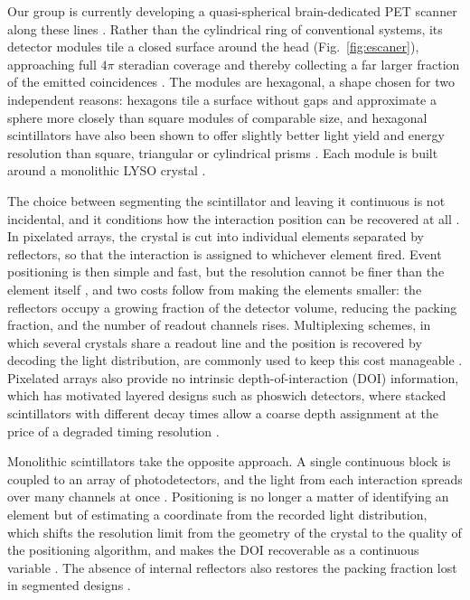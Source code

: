 \documentclass[10pt,conference]{IEEEtran}
\begin{document}
Our group is currently developing a quasi-spherical brain-dedicated PET
scanner along these lines \cite{perez-benito_sipm-based_2019}. Rather than
the cylindrical ring of conventional systems, its detector modules tile a
closed surface around the head (Fig.~\ref{fig:escaner}), approaching full $4\pi$ steradian coverage
and thereby collecting a far larger fraction of the emitted coincidences
\cite{perez-benito_sipm-based_2019}. The modules are hexagonal, a shape
chosen for two independent reasons: hexagons tile a surface without gaps and
approximate a sphere more closely than square modules of comparable size,
and hexagonal scintillators have also been shown to offer slightly better
light yield and energy resolution than square, triangular or cylindrical
prisms \cite{perez-benito_scintillator_2023}. Each module is built around a monolithic LYSO crystal
\cite{perez-benito_laser-microstructured_2025}.


The choice between segmenting the scintillator and leaving it continuous is
not incidental, and it conditions how the interaction position can be
recovered at all \cite{gonzalezmontoro2022}. In pixelated arrays, the
crystal is cut into individual elements separated by reflectors, so that the
interaction is assigned to whichever element fired. Event positioning is
then simple and fast, but the resolution cannot be finer than the element
itself \cite{moses2011}, and two costs follow from making the elements
smaller: the reflectors occupy a growing fraction of the detector volume,
reducing the packing fraction, and the number of readout channels rises.
Multiplexing schemes, in which several crystals share a readout line and the
position is recovered by decoding the light distribution, are commonly used
to keep this cost manageable \cite{sanaat2024}. Pixelated arrays also
provide no intrinsic depth-of-interaction (DOI) information, which has motivated
layered designs such as phoswich detectors, where stacked scintillators with
different decay times allow a coarse depth assignment at the price of a
degraded timing resolution \cite{sanaat2024}.

Monolithic scintillators take the opposite approach. A single continuous
block is coupled to an array of photodetectors, and the light from each
interaction spreads over many channels at once \cite{gonzalezmontoro2022}. 
Positioning is no longer a matter of identifying an element but of
estimating a coordinate from the recorded light distribution, which shifts
the resolution limit from the geometry of the crystal to the quality of the
positioning algorithm, and makes the DOI recoverable as a
continuous variable \cite{espana_digipet_2014}. The absence of internal reflectors
also restores the packing fraction lost in segmented designs
\cite{sanaat2024}.
\end{document}
